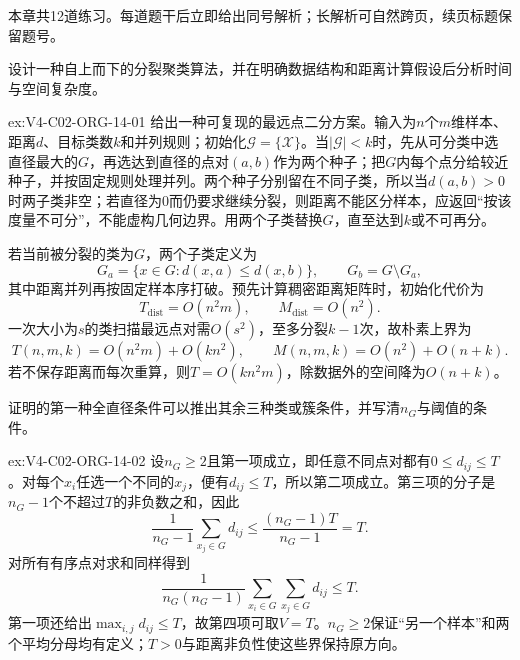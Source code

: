 \label{struct:V4-C02-CH34}
\begin{chapterexercisebox}
\label{struct:V4-C02-CH35}
本章共12道练习。每道题干后立即给出同号解析；长解析可自然跨页，续页标题保留题号。
\end{chapterexercisebox}

\begin{SLChapterExercisePairSection}

\begin{exercise}\label{ex:V4-C02-ORG-14-01}
设计一种自上而下的分裂聚类算法，并在明确数据结构和距离计算假设后分析时间与空间复杂度。
\end{exercise}
\ifSLFullEdition
{}\label{sol:V4-C02-ORG-14-01}
\begin{chapterexercisesolution}{ex:V4-C02-ORG-14-01}
给出一种可复现的最远点二分方案。输入为$n$个$m$维样本、距离$d$、目标类数$k$和并列规则；初始化$\mathcal G=\{\mathcal X\}$。当$|\mathcal G|<k$时，先从可分类中选直径最大的$G$，再选达到直径的点对$(a,b)$作为两个种子；把$G$内每个点分给较近种子，并按固定规则处理并列。两个种子分别留在不同子类，所以当$d(a,b)>0$时两子类非空；若直径为0而仍要求继续分裂，则距离不能区分样本，应返回“按该度量不可分”，不能虚构几何边界。用两个子类替换$G$，直至达到$k$或不可再分。

若当前被分裂的类为$G$，两个子类定义为
\[
G_a=\{x\in G:d(x,a)\le d(x,b)\},
\qquad
G_b=G\setminus G_a,
\]
其中距离并列再按固定样本序打破。预先计算稠密距离矩阵时，初始化代价为
\[
T_{\mathrm{dist}}=O(n^2m),
\qquad
M_{\mathrm{dist}}=O(n^2).
\]
一次大小为$s$的类扫描最远点对需$O(s^2)$，至多分裂$k-1$次，故朴素上界为
\[
T(n,m,k)=O(n^2m)+O(kn^2),
\qquad
M(n,m,k)=O(n^2)+O(n+k).
\]
若不保存距离而每次重算，则$T=O(kn^2m)$，除数据外的空间降为$O(n+k)$。
\end{chapterexercisesolution}
\fi

\begin{exercise}\label{ex:V4-C02-ORG-14-02}
证明的第一种全直径条件可以推出其余三种类或簇条件，并写清$n_G$与阈值的条件。
\end{exercise}
\ifSLFullEdition
{}\label{sol:V4-C02-ORG-14-02}
\begin{chapterexercisesolution}{ex:V4-C02-ORG-14-02}
设$n_G\geq2$且第一项成立，即任意不同点对都有$0\leq d_{ij}\leq T$。对每个$x_i$任选一个不同的$x_j$，便有$d_{ij}\leq T$，所以第二项成立。第三项的分子是$n_G-1$个不超过$T$的非负数之和，因此
\[
\frac1{n_G-1}\sum_{x_j\in G}d_{ij}
\leq\frac{(n_G-1)T}{n_G-1}=T.
\]
对所有有序点对求和同样得到
\[
\frac1{n_G(n_G-1)}\sum_{x_i\in G}\sum_{x_j\in G}d_{ij}\leq T.
\]
第一项还给出$\max_{i,j}d_{ij}\leq T$，故第四项可取$V=T$。$n_G\geq2$保证“另一个样本”和两个平均分母均有定义；$T>0$与距离非负性使这些界保持原方向。
\end{chapterexercisesolution}
\fi


\end{SLChapterExercisePairSection}
